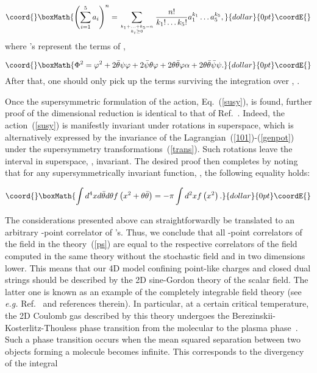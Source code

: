 \documentclass[a4paper,12pt]{article}
\begin{document}
$$\coord{}\boxMath{\left(\sum\limits_{i=1}^{5}a_i\right)^n=\sum\limits_{{k_1+\ldots+k_5=n}\atop {k_i\ge 0}}^{}
\frac{n!}{k_1!\ldots k_5!}a_1^{k_1}\ldots a_5^{k_5},}{dollar}{0pt}\coordE{}$$
where \coordHE{}'s represent the terms of \coordHE{}, 

$$\coord{}\boxMath{\Phi^2=\varphi^2+2\bar\theta\psi\varphi+2\bar\psi\theta\varphi+2\theta\bar\theta\varphi\alpha+
2\theta\bar\theta\bar\psi\psi.}{dollar}{0pt}\coordE{}$$
After that, one should only pick up the terms surviving the integration over \myHighlight{$\bar\theta$}\coordHE{}, \myHighlight{$\theta$}\coordHE{}. 

Once the supersymmetric formulation of the action, Eq.~(\ref{susy}), is found, further proof of the dimensional reduction 
is identical to that of Ref.~\cite{ps}. Indeed, the action~(\ref{susy}) is manifestly invariant 
under rotations in superspace, which is alternatively 
expressed by the invariance of the Lagrangian~(\ref{101})-(\ref{genpot}) under 
the supersymmetry transformations~(\ref{trans}).  
Such rotations leave the interval in superspace, \coordHE{}, invariant.
The desired proof then completes by noting that for any supersymmetrically invariant function,
\coordHE{}, the following equality holds:

$$\coord{}\boxMath{
\int d^4xd\bar\theta d\theta f\left(x^2+\theta\bar\theta\right)=-\pi\int d^2xf\left(x^2\right).}{dollar}{0pt}\coordE{}$$

The considerations presented above can straightforwardly be translated to an arbitrary \coordHE{}-point correlator 
of \coordHE{}'s. Thus, we conclude that all \coordHE{}-point correlators of the field \coordHE{} 
in the theory~(\ref{ps}) are equal to the respective correlators of the field \myHighlight{$\varphi$}\coordHE{} computed 
in the same theory without the stochastic field \coordHE{} and in two dimensions lower. This means that 
our 4D model confining point-like charges and closed dual strings should be described by the 2D sine-Gordon theory
of the scalar field. The latter one is known as an example of the completely 
integrable field theory (see {\it e.g.} Ref.~\cite{tf} and references therein).
In particular, at a certain critical temperature, the 2D Coulomb gas described by this theory undergoes
the Berezinskii-Kosterlitz-Thouless phase transition from the molecular to the plasma phase~\cite{bkt}. Such a phase transition occurs
when the mean squared separation between two objects forming a molecule becomes infinite. This corresponds to the divergency 
of the integral  
\end{document}
